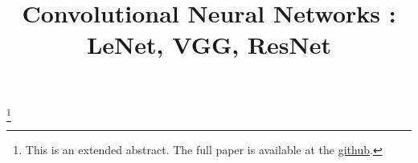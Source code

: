 \documentclass[extendedabs]{bmvc2k}
\begin{document}
\title{Convolutional Neural Networks : LeNet, VGG, ResNet}
 
\maketitle
\let\thefootnote\relax\footnote{This is an extended abstract. The full paper is available at the \href{https://github.com/LeeGwanHui/TIL/tree/main/deeplearning_ham}{github}. }
\vspace{-0.2in}


\newpage

\end{document}
